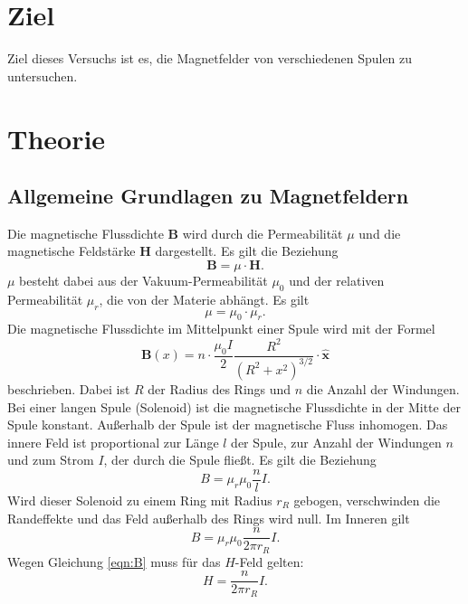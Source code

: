 \section{Ziel}
Ziel dieses Versuchs ist es, die Magnetfelder von verschiedenen
Spulen zu untersuchen. %

\section{Theorie}
\label{sec:Theorie}


\subsection{Allgemeine Grundlagen zu Magnetfeldern} %
Die magnetische Flussdichte $\symbf{B}$ wird durch die Permeabilität $\mu$ und die 
magnetische Feldstärke $\symbf{H}$ dargestellt. Es gilt die Beziehung 
\begin{equation} 
    \symbf{B} = \mu \cdot \symbf{H}.
    \label{eqn:B}
\end{equation}
$\mu$ besteht dabei aus der Vakuum-Permeabilität $\mu_{0}$ und der relativen 
Permeabilität $\mu_{r}$, die von der Materie abhängt. 
Es gilt 
\begin{equation*} 
    \mu = \mu_{0} \cdot \mu_{r}.
\end{equation*}
\newline
Die magnetische Flussdichte im Mittelpunkt einer Spule wird mit der Formel 
\begin{equation}
    \symbf{B}(x)= n \cdot \frac{\mu_{0} I}{2} \frac{R^2}{(R^2 +x^2)^{3/2}}\cdot \symbf{\hat{x}}
    \label{eqn:kurzespule}
\end{equation}
beschrieben. 
Dabei ist $R$ der Radius des Rings und $n$ die Anzahl der Windungen.
\newline
Bei einer langen Spule (Solenoid) ist die magnetische Flussdichte in der Mitte der 
Spule konstant. Außerhalb der Spule ist der magnetische Fluss inhomogen. 
Das innere Feld ist proportional zur Länge $l$ der Spule, zur Anzahl der Windungen 
$n$ und zum Strom $I$, der durch die Spule fließt. 
Es gilt die Beziehung
\begin{equation}
    B = \mu_{r} \mu_{0} \frac{n}{l} I.
    \label{eqn:langespule}
\end{equation}
Wird dieser Solenoid zu einem Ring mit Radius $r_{R}$ gebogen, verschwinden die 
Randeffekte und das Feld außerhalb des Rings wird null. 
Im Inneren gilt
\begin{equation}
    B = \mu_{r} \mu_{0} \frac{n}{2\pi r_{R}} I.
    \label{eqn:ring}
\end{equation}
Wegen Gleichung \eqref{eqn:B} muss für das $H$-Feld gelten:
\begin{equation}
    H = \frac{n}{2\pi r_{R}} I.
    \label{eqn:H}
\end{equation}


